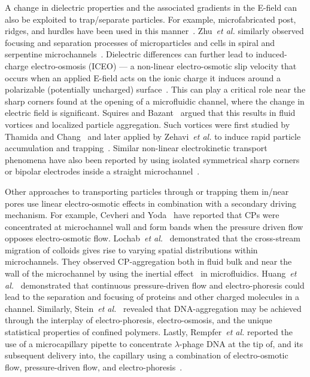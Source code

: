 \documentclass[twoside,twocolumn,9pt]{article}
\begin{document}
A change in dielectric properties and the associated gradients in the E-field can also be exploited to trap/separate particles.
For example, microfabricated post, ridges, and hurdles have been used in this manner~\cite{Cummings_Diele_2003, Lapizco-Encinas_dielec_2004, Barrett_Dielec_2005, Baylon-Cardiel_Diele_2010}. 
Zhu~\textit{et al.} similarly observed focusing and separation processes of microparticles and cells in spiral and serpentine microchannels~\cite{zhu_dc_2009,zhu_continuous_2010, zhu_curvature-induced_2011, zhu_continuous-flow_2011}. 
Dielectric differences can further lead to induced-charge electro-osmosis (ICEO) --- a non-linear electro-osmotic slip velocity that occurs when an applied E-field acts on the ionic charge it induces around a polarizable (potentially uncharged) surface~\cite{squires_bazant_2004}. 
This can play a critical role near the sharp corners found at the opening of a microfluidic channel, where the change in electric field is significant. 
Squires and Bazant~\cite{squires_bazant_2004} argued that this results in fluid vortices and localized particle aggregation. 
Such vortices were first studied by Thamida and Chang~\cite{thamida_nonlinear_2002, takhistov_chang_electrokinetic_2003} and later applied by Zehavi~\textit{et al.} to induce rapid particle accumulation and trapping~\cite{zehavi_particle_2014, zehavi_competition_2016}. 
Similar non-linear electrokinetic transport phenomena have also been reported by using isolated symmetrical sharp corners~\cite{chen_vortex_2008, eckstein_Yossifon_nonlinear_2009} or bipolar electrodes inside a straight microchannel~\cite{ wu_ac_2008, islamPerformanceImprovementAC2013, eden_modeling_2019}. 


Other approaches to transporting particles through or trapping them in/near pores use linear electro-osmotic effects in combination with a secondary driving mechanism. 
For example, Cevheri and Yoda~\cite{cevheriElectrokineticallyDrivenReversible2014, yeeExperimentalObservationsBands2018} have reported that CPs were concentrated at microchannel wall and form bands when the pressure driven flow opposes electro-osmotic flow.
Lochab~\textit{et al.}~\cite{lochabDynamicsColloidalParticles2019} demonstrated that the cross-stream migration of colloids gives rise to varying spatial distributions within microchannels. They observed CP-aggregation both in fluid bulk and near the wall of the microchannel by using the inertial effect~\cite{carloInertialMicrofluidics2009} in microfluidics. 
Huang~\textit{et al.}~\cite{huang_digitally_1999} demonstrated that continuous pressure-driven flow and electro-phoresis could lead to the separation and focusing of proteins and other charged molecules in a channel.
Similarly, Stein~\textit{et al.}~\cite{stein_electrokinetic_2010} revealed that DNA-aggregation may be achieved through the interplay of electro-phoresis, electro-osmosis, and the unique statistical properties of confined polymers. 
Lastly, Rempfer~\textit{et al.} reported the use of a microcapillary pipette to concentrate $\lambda$-phage DNA at the tip of, and its subsequent delivery into, the capillary using a combination of electro-osmotic flow, pressure-driven flow, and electro-phoresis~\cite{Joost_rempfer_selective_2016, rempfer_NP_2017}. 
\end{document}
